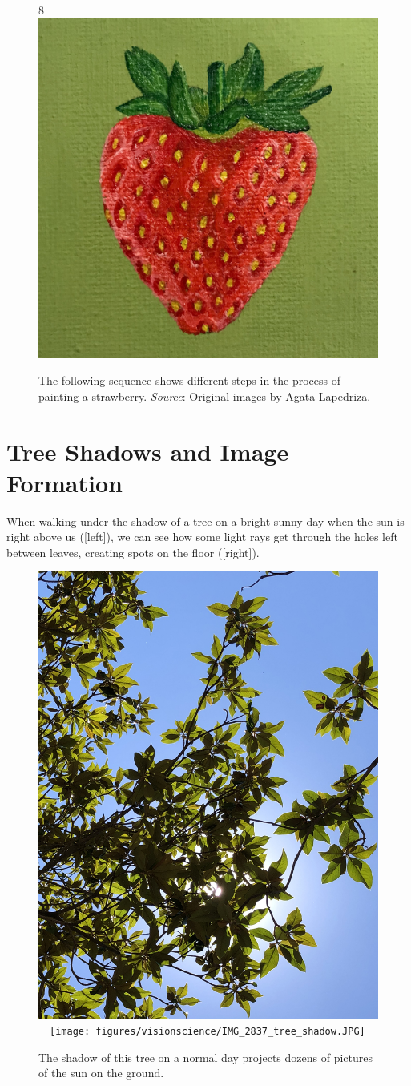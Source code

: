 \begin{figure}
{    8\includegraphics[width=.22\linewidth]{figures/visionscience/fresa_8.jpg} %
    }
    \caption{The following sequence shows different steps in the process of painting a strawberry. {\em Source}: Original images by Agata Lapedriza.}
    \label{fig:agata_painting}
\end{figure}






\section{Tree Shadows and Image Formation}

When walking under the shadow of a tree on a bright sunny day when the sun is right above us (\fig{\ref{fig:tree_pinholes}}[left]), we can see how some light rays get through the holes left between leaves, creating spots on the floor (\fig{\ref{fig:tree_pinholes}}[right]). 


\begin{figure}[h!]
\centerline{
    \includegraphics[width=.497\linewidth]{figures/visionscience/IMG_2842_tree_pinholes.jpg} %
    ~~\texttt{[image: figures/visionscience/IMG\_2837\_tree\_shadow.JPG]} %
}
\caption{The shadow of this tree on a normal day projects dozens of pictures of the sun on the ground.}
\label{fig:tree_pinholes}
\end{figure}

